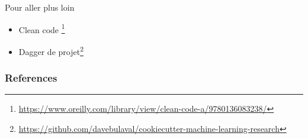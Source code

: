 \documentclass{beamer}
\begin{document}
	\begin{frame}{Pour aller plus loin}
		\begin{itemize}
			\item Clean code \footnote{\url{https://www.oreilly.com/library/view/clean-code-a/9780136083238/}}
			\item Dagger de projet\footnote{\url{https://github.com/davebulaval/cookiecutter-machine-learning-research}}
		\end{itemize}
	\end{frame}
	
	\begin{frame}[t, allowframebreaks]
		\frametitle{References}
		
		
	\end{frame}
	
\end{document}
